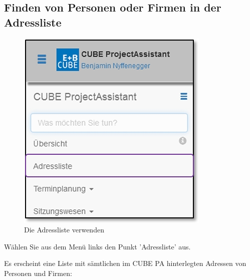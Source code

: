 \pagebreak
\subsection{Finden von Personen oder Firmen in der Adressliste}

\begin{figure}   %
  \vspace{-35pt}      %
  \begin{center}
    \includegraphics[width=1\linewidth]{../chapters/03_Adressliste/pictures/3-1_Menu_Adressliste.jpg}
  \end{center}
  \vspace{-20pt}
  \caption{Die Adressliste verwenden}
  \vspace{-10pt}
\end{figure}

Wählen Sie aus dem Menü links den Punkt 'Adressliste' aus.

\vspace{7cm}

Es erscheint eine Liste mit sämtlichen im CUBE PA hinterlegten Adressen von Personen und Firmen:

